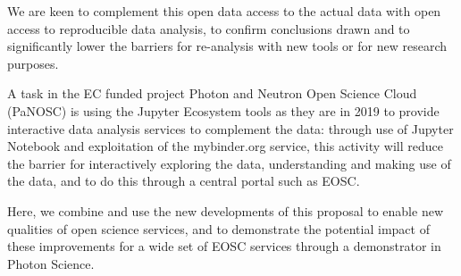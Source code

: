   We are keen to complement this open data access to the actual data
  with open access to reproducible data analysis, to confirm
  conclusions drawn and to significantly lower the barriers for
  re-analysis with new tools or for new research purposes.

  A task in the EC funded project Photon and Neutron Open Science
  Cloud (PaNOSC) is using the Jupyter Ecosystem tools as they are in
  2019 to provide interactive data analysis services to complement the
  data: through use of Jupyter Notebook and exploitation of the
  mybinder.org service, this activity will reduce the barrier for
  interactively exploring the data, understanding and making use of
  the data, and to do this through a central portal such as EOSC.

  Here, we combine and use the new developments of this
  proposal to enable new qualities of open science services, and to
  demonstrate the potential impact of these improvements for a wide
  set of EOSC services through a demonstrator in Photon Science.

  \medskip

